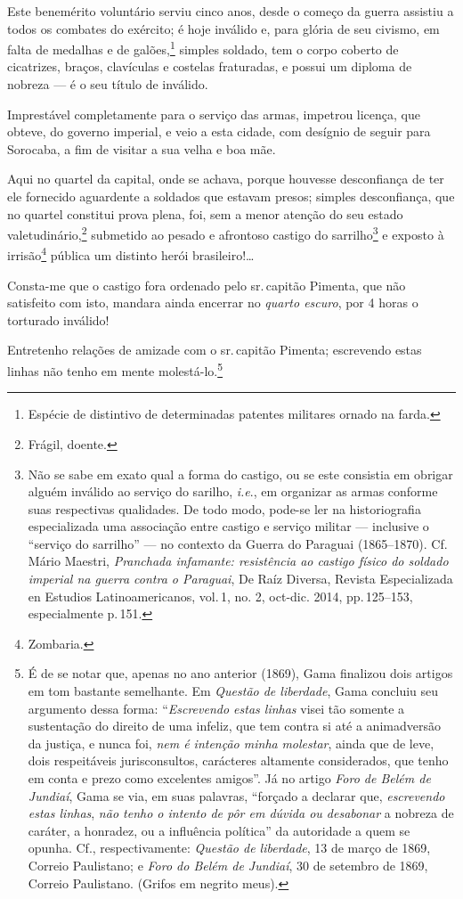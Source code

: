 Este benemérito voluntário serviu cinco anos, desde o começo da guerra
assistiu a todos os combates do exército; é hoje inválido e, para glória
de seu civismo, em falta de medalhas e de galões,\footnote{ Espécie
  de distintivo de determinadas patentes militares ornado na farda.}
simples soldado, tem o corpo coberto de cicatrizes, braços, clavículas e
costelas fraturadas, e possui um diploma de nobreza --- é o seu título de
inválido.

Imprestável completamente para o serviço das armas, impetrou licença,
que obteve, do governo imperial, e veio a esta cidade, com desígnio de
seguir para Sorocaba, a fim de visitar a sua velha e boa mãe.

Aqui no quartel da capital, onde se achava, porque houvesse desconfiança
de ter ele fornecido aguardente a soldados que estavam presos; simples
desconfiança, que no quartel constitui prova plena, foi, sem a menor
atenção do seu estado valetudinário,\footnote{ Frágil, doente.}
submetido ao pesado e afrontoso castigo do sarrilho\footnote{ Não se
  sabe em exato qual a forma do castigo, ou se este consistia em obrigar
  alguém inválido ao serviço do sarilho, \emph{i.e}., em organizar as
  armas conforme suas respectivas qualidades. De todo modo, pode-se ler
  na historiografia especializada uma associação entre castigo e serviço
  militar --- inclusive o ``serviço do sarrilho'' --- no contexto da
  Guerra do Paraguai (1865--1870). Cf. Mário Maestri, \emph{Pranchada
  infamante: resistência ao castigo físico do soldado imperial na guerra
  contra o Paraguai}, De Raíz Diversa, Revista Especializada en Estudios
  Latinoamericanos, vol.\,1, no. 2, oct-dic. 2014, pp.\,125--153,
  especialmente p.\,151.} e exposto à irrisão\footnote{ Zombaria.}
pública um distinto herói brasileiro!\ldots{}

Consta-me que o castigo fora ordenado pelo sr.\,capitão Pimenta, que não
satisfeito com isto, mandara ainda encerrar no \emph{quarto escuro}, por
4 horas o torturado inválido!

Entretenho relações de amizade com o sr.\,capitão Pimenta; escrevendo
estas linhas não tenho em mente molestá-lo.\footnote{ É de se notar
  que, apenas no ano anterior (1869), Gama finalizou dois artigos em tom
  bastante semelhante. Em \emph{Questão de liberdade}, Gama concluiu seu
  argumento dessa forma: ``\textit{Escrevendo estas linhas} visei tão
  somente a sustentação do direito de uma infeliz, que tem contra si até
  a animadversão da justiça, e nunca foi, \textit{nem
  é intenção minha} \textit{molestar}, ainda que de leve, dois
  respeitáveis jurisconsultos, carácteres altamente considerados, que
  tenho em conta e prezo como excelentes amigos''. Já no artigo
  \emph{Foro de Belém de Jundiaí}, Gama se via, em suas palavras,
  ``forçado a declarar que, \textit{escrevendo estas linhas},
  \textit{não tenho o intento de pôr em dúvida ou desabonar} a nobreza
  de caráter, a honradez, ou a influência política'' da autoridade a
  quem se opunha. Cf., respectivamente: \emph{Questão de liberdade},
  13 de março de 1869, Correio Paulistano; e \emph{Foro do Belém de Jundiaí},
  30 de setembro de 1869, Correio Paulistano. (Grifos em negrito meus).}

